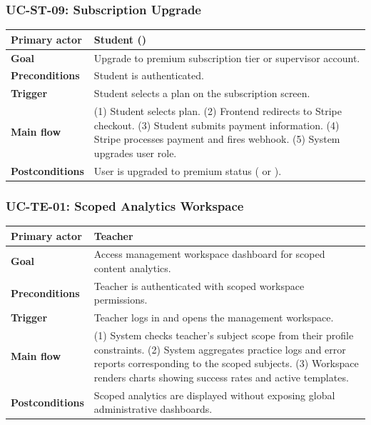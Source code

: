 \subsubsection{UC-ST-09: Subscription Upgrade}
\begin{longtable}{L{0.28\textwidth}L{0.62\textwidth}}
\textbf{Primary actor} & Student () \\ \hline
\textbf{Goal} & Upgrade to premium subscription tier or supervisor account. \\ \hline
\textbf{Preconditions} & Student is authenticated. \\ \hline
\textbf{Trigger} & Student selects a plan on the subscription screen. \\ \hline
\textbf{Main flow} & (1) Student selects plan. (2) Frontend redirects to Stripe checkout. (3) Student submits payment information. (4) Stripe processes payment and fires webhook. (5) System upgrades user role. \\ \hline
\textbf{Postconditions} & User is upgraded to premium status ( or ). \\
\end{longtable}

\subsubsection{UC-TE-01: Scoped Analytics Workspace}
\begin{longtable}{L{0.28\textwidth}L{0.62\textwidth}}
\textbf{Primary actor} & Teacher \\ \hline
\textbf{Goal} & Access management workspace dashboard for scoped content analytics. \\ \hline
\textbf{Preconditions} & Teacher is authenticated with scoped workspace permissions. \\ \hline
\textbf{Trigger} & Teacher logs in and opens the management workspace. \\ \hline
\textbf{Main flow} & (1) System checks teacher's subject scope from their profile constraints. (2) System aggregates practice logs and error reports corresponding to the scoped subjects. (3) Workspace renders charts showing success rates and active templates. \\ \hline
\textbf{Postconditions} & Scoped analytics are displayed without exposing global administrative dashboards. \\
\end{longtable}

